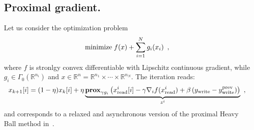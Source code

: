 \documentclass[envcountsect]{svjour3}
\newcommand{\reals}{{\mathbb{R} }}
\newcommand{\prox}{\operatorname{\bf prox}}
\begin{document}
 \subsection{Proximal gradient. }{\label{subsec::prox_gradient}}
 Let us consider the optimization problem
 \begin{equation}{\label{eq::FBS}}
  \mbox{minimize}\; f(x) + \sum_{i=1}^N g_i(x_i)\enspace,
 \end{equation}
 where $f$ is stronlgy convex differentiable with Lipschitz continuous gradient, while $g_i\in\Gamma_0(\reals^{n_i})$ and $x\in\reals^n=\reals^{n_1}\times\cdots\times\reals^{n_N}$.
 The iteration reads:
  \[
   x_{k+1}[i] = (1-\eta)x_{k}[i] + \eta\underbrace{\prox_{\gamma g_{i}}\left(x_\mathrm{read}^i[i]-\gamma\nabla_{i}f(x_\mathrm{read}^i)+\beta\left(y_\mathrm{write}-y_\mathrm{write}^\mathrm{prev}\right)\right)}_{z^i}\enspace,
 \]
and corresponds to a relaxed and asynchronous version of the proximal Heavy Ball method in~\cite{ipiasco}.
\end{document}
